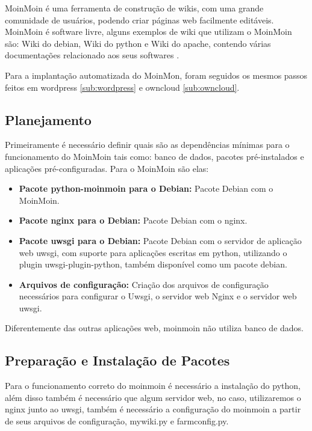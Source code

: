 MoinMoin é uma ferramenta de construção
de wikis, com uma grande comunidade de usuários, podendo criar páginas web
facilmente editáveis. MoinMoin é software livre, alguns exemplos
de wiki que utilizam o MoinMoin são: Wiki do debian, Wiki do python e Wiki do apache,
contendo várias documentações relacionado aos seus softwares \cite{moin}. 

Para a implantação automatizada do MoinMon, foram seguidos os mesmos passos
feitos em wordpress \ref{sub:wordpress} e owncloud \ref{sub:owncloud}.

\subsection{Planejamento}

Primeiramente é necessário definir quais são as dependências
mínimas para o funcionamento do MoinMoin tais como: banco de dados, pacotes
pré-instalados e aplicações pré-configuradas. Para o MoinMoin são elas:

\begin{itemize}
   \item \textbf{Pacote python-moinmoin para o Debian:} Pacote Debian com o MoinMoin.
   \item \textbf{Pacote nginx para o Debian:} Pacote Debian com o nginx.
   \item \textbf{Pacote uwsgi para o Debian:} Pacote Debian com o servidor de aplicação web
uwsgi, com suporte para aplicações escritas em python, utilizando o plugin uwsgi-plugin-python,
também disponível como um pacote debian.
   \item \textbf{Arquivos de configuração:} Criação dos arquivos de configuração
   necessários para configurar o Uwsgi, o servidor web Nginx e o servidor web
uwsgi.
\end{itemize}

Diferentemente das outras aplicações web, moinmoin não utiliza banco de dados.

\subsection{Preparação e Instalação de Pacotes}

Para o funcionamento correto do moinmoin é necessário a instalação do python, além
disso também é necessário que algum servidor web, no caso, utilizaremos o nginx
junto ao uwsgi, também é necessário a configuração do moinmoin a partir de seus
arquivos de configuração, mywiki.py e farmconfig.py.

